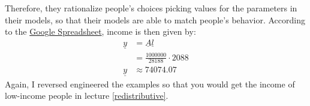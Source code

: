 \documentclass[]{book}
\begin{document}
\begin{enumerate}
{    Therefore, they rationalize people's choices picking values for the
    parameters in their models, so that their models are able to match
    people's behavior.} According to the
  \href{https://docs.google.com/spreadsheets/d/1faC3VTuXmo7wo4njkO2ERytzlJmbMgcckVj9ag_Mn6s/edit?usp=sharing}{Google
  Spreadsheet}, income is then given by: \[
  \begin{aligned}
  \underline{y}&=\underline{A} \underline{l}\\
  &=\frac{1000000}{28188}\cdot 2088\\
  \underline{y}&\approx 74074.07
  \end{aligned}
  \] Again, I reversed engineered the examples so that you would get the
  income of low-income people in lecture \ref{redistributive}.
\end{enumerate}
\end{document}
